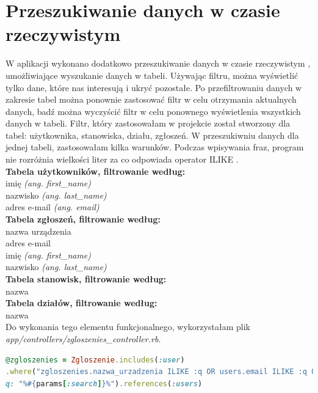\documentclass[openright]{xmgr}
\begin{document}
	\newpage
	\section{Przeszukiwanie danych w czasie rzeczywistym}
	
	W aplikacji wykonano dodatkowo przeszukiwanie danych w czasie rzeczywistym \cite{filtrowanie}, umożliwiające wyszukanie danych w tabeli. Używając filtru, można wyświetlić tylko dane, które nas interesują i ukryć pozostałe. Po przefiltrowaniu danych w zakresie tabel można ponownie zastosować filtr w celu otrzymania aktualnych danych, badź można wyczyścić filtr w celu ponownego wyświetlenia wszystkich danych w tabeli. 
	Filtr, który zastosowałam w projekcie został stworzony dla tabel: użytkownika, stanowiska, działu, zgłoszeń. W przeszukiwniu danych dla jednej tabeli, zastosowałam kilka warunków. Podczas wpisywania fraz, program nie rozróżnia wielkości liter za co odpowiada operator ILIKE .\\
	
	\textbf{Tabela użytkowników, filtrowanie według:}\\
	\textendash\space imię \textit{(ang. first\_name)}\\
	\textendash\space nazwisko \textit{(ang. last\_name)}\\
	\textendash\space adres e-mail
	\textit{(ang. email)}\\
	
	\textbf{Tabela zgłoszeń, filtrowanie według:}\\
	\textendash\space nazwa urządzenia\\
	\textendash\space adres e-mail\\
	\textendash\space imię
	\textit{(ang. first\_name)}\\
	\textendash\space nazwisko
	\textit{(ang. last\_name)}\\
	
	\textbf{Tabela stanowisk, filtrowanie według:}\\
	\textendash\space nazwa\\
	
	\textbf{Tabela działów, filtrowanie według:}\\
	\textendash\space nazwa\\
	
	Do wykonania tego elementu funkcjonalnego, wykorzystałam plik\\
	\textit{app/controllers/zgloszenies\_controller.rb.}
	
	\begin{lstlisting}[language=Ruby,lineskip={-1pt},caption=Dane według których nastepuje przeszukiwanie]
@zgloszenies = Zgloszenie.includes(:user)
.where("zgloszenies.nazwa_urzadzenia ILIKE :q OR users.email ILIKE :q OR users.first_name ILIKE :q OR users.last_name ILIKE :q", 
q: "%#{params[:search]}%").references(:users)
	\end{lstlisting}
	
\end{document}
